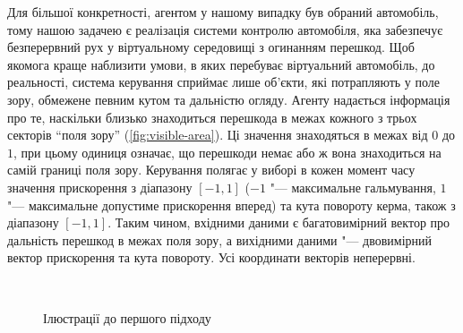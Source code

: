 \documentclass[a4paper,10pt,fleqn]{article}
\begin{document}
Для більшої конкретності, агентом у нашому випадку був обраний автомобіль, тому нашою задачею є реалізація системи контролю автомобіля, яка забезпечує безперервний рух у віртуальному середовищі з огинанням перешкод. Щоб якомога краще наблизити умови, в яких перебуває віртуальний автомобіль, до реальності, система керування сприймає лише об'єкти, які потрапляють у поле зору, обмежене певним кутом та дальністю огляду. Агенту надається інформація про те, наскільки близько знаходиться перешкода в межах кожного з трьох секторів ``поля зору'' (\ref{fig:visible-area}). Ці значення знаходяться в межах від $0$ до $1$, при цьому одиниця означає, що перешкоди немає або ж вона знаходиться на самій границі поля зору. Керування полягає у виборі в кожен момент часу значення прискорення з діапазону $[-1,1]$ ($-1$ "--- максимальне гальмування, $1$ "--- максимальне допустиме прискорення вперед) та кута повороту керма, також з діапазону $[-1,1]$. Таким чином, вхідними даними є багатовимірний вектор про дальність перешкод в межах поля зору, а вихідними даними "--- двовимірний вектор прискорення та кута повороту. Усі координати векторів неперервні. 
\begin{figure}
  \centering
  \,
  \caption{Ілюстрації до першого підходу}
  \label{fig:car-related}
\end{figure}
\end{document}
